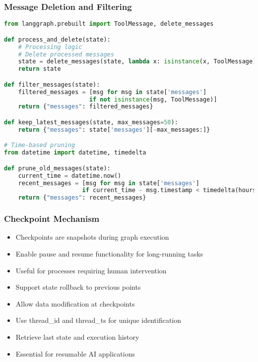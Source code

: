 \begin{frame}[fragile]\frametitle{Message Deletion and Filtering}
      \begin{lstlisting}[language=Python, basicstyle=\tiny]
from langgraph.prebuilt import ToolMessage, delete_messages

def process_and_delete(state):
    # Processing logic
    # Delete processed messages
    state = delete_messages(state, lambda x: isinstance(x, ToolMessage))
    return state

def filter_messages(state):
    filtered_messages = [msg for msg in state['messages'] 
                        if not isinstance(msg, ToolMessage)]
    return {"messages": filtered_messages}

def keep_latest_messages(state, max_messages=50):
    return {"messages": state['messages'][-max_messages:]}

# Time-based pruning
from datetime import datetime, timedelta

def prune_old_messages(state):
    current_time = datetime.now()
    recent_messages = [msg for msg in state['messages'] 
                      if current_time - msg.timestamp < timedelta(hours=1)]
    return {"messages": recent_messages}
      \end{lstlisting}
\end{frame}

\begin{frame}[fragile]\frametitle{Checkpoint Mechanism}
      \begin{itemize}
        \item Checkpoints are snapshots during graph execution
        \item Enable pause and resume functionality for long-running tasks
        \item Useful for processes requiring human intervention
        \item Support state rollback to previous points
        \item Allow data modification at checkpoints
        \item Use thread\_id and thread\_ts for unique identification
        \item Retrieve last state and execution history
        \item Essential for resumable AI applications
      \end{itemize}
\end{frame}

